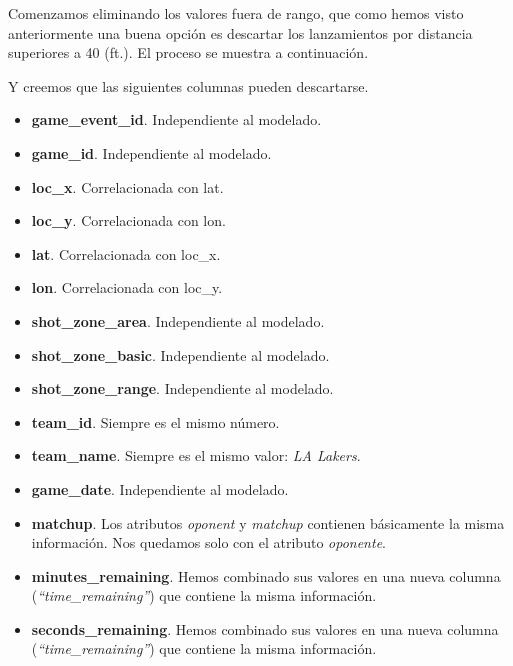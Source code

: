 \documentclass[
]{article}
\newenvironment{Shaded}{\begin{snugshade}}{\end{snugshade}}
\newcommand{\DecValTok}[1]{\textcolor[rgb]{0.00,0.00,0.81}{#1}}
\newcommand{\NormalTok}[1]{#1}
\newcommand{\OperatorTok}[1]{\textcolor[rgb]{0.81,0.36,0.00}{\textbf{#1}}}
\newcommand{\StringTok}[1]{\textcolor[rgb]{0.31,0.60,0.02}{#1}}
\providecommand{\tightlist}{%
  \setlength{\itemsep}{0pt}\setlength{\parskip}{0pt}}
\begin{document}
Comenzamos eliminando los valores fuera de rango, que como hemos visto
anteriormente una buena opción es descartar los lanzamientos por
distancia superiores a 40 (ft.). El proceso se muestra a continuación.

\begin{Shaded}
\end{Shaded}

Y creemos que las siguientes columnas pueden descartarse.

\begin{itemize}
\tightlist
\item
  \textbf{game\_event\_id}. Independiente al modelado.
\item
  \textbf{game\_id}. Independiente al modelado.
\item
  \textbf{loc\_x}. Correlacionada con lat.
\item
  \textbf{loc\_y}. Correlacionada con lon.
\item
  \textbf{lat}. Correlacionada con loc\_x.
\item
  \textbf{lon}. Correlacionada con loc\_y.
\item
  \textbf{shot\_zone\_area}. Independiente al modelado.
\item
  \textbf{shot\_zone\_basic}. Independiente al modelado.
\item
  \textbf{shot\_zone\_range}. Independiente al modelado.
\item
  \textbf{team\_id}. Siempre es el mismo número.
\item
  \textbf{team\_name}. Siempre es el mismo valor: \emph{LA Lakers}.
\item
  \textbf{game\_date}. Independiente al modelado.
\item
  \textbf{matchup}. Los atributos \emph{oponent} y \emph{matchup}
  contienen básicamente la misma información. Nos quedamos solo con el
  atributo \emph{oponente}.
\item
  \textbf{minutes\_remaining}. Hemos combinado sus valores en una nueva
  columna (\emph{``time\_remaining''}) que contiene la misma
  información.
\item
  \textbf{seconds\_remaining}. Hemos combinado sus valores en una nueva
  columna (\emph{``time\_remaining''}) que contiene la misma
  información.
\end{itemize}
\end{document}
